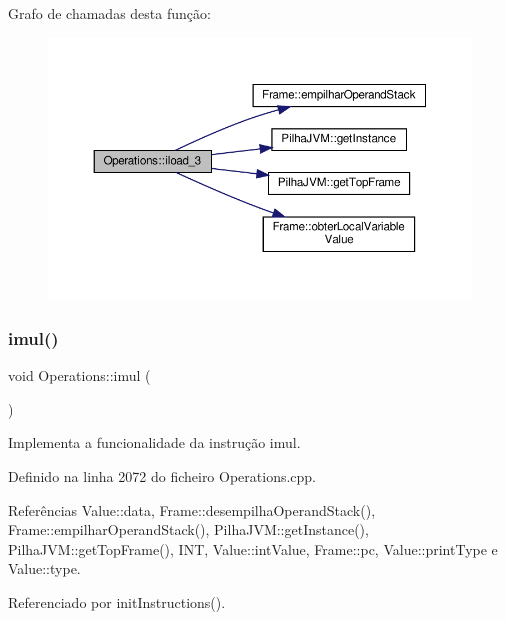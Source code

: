 Grafo de chamadas desta função\+:\nopagebreak
\begin{figure}[H]
\begin{center}
\leavevmode
\includegraphics[width=350pt]{classOperations_a3f645534291129289ee71c708dbe633c_cgraph}
\end{center}
\end{figure}
\mbox{\label{classOperations_a01b2ffdd380327b31b03657eb99b8a81}} 
\subsubsection{\texorpdfstring{imul()}{imul()}}
{\footnotesize\ttfamily void Operations\+::imul (\begin{DoxyParamCaption}{ }\end{DoxyParamCaption})\hspace{0.3cm}{\ttfamily [private]}}



Implementa a funcionalidade da instrução imul. 



Definido na linha 2072 do ficheiro Operations.\+cpp.



Referências Value\+::data, Frame\+::desempilha\+Operand\+Stack(), Frame\+::empilhar\+Operand\+Stack(), Pilha\+J\+V\+M\+::get\+Instance(), Pilha\+J\+V\+M\+::get\+Top\+Frame(), I\+NT, Value\+::int\+Value, Frame\+::pc, Value\+::print\+Type e Value\+::type.



Referenciado por init\+Instructions().


